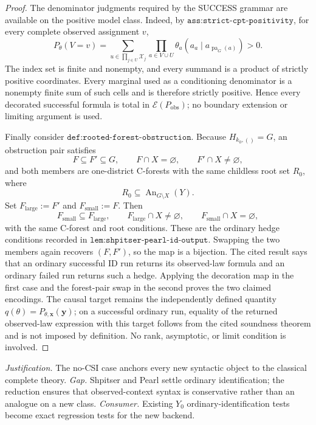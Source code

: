 \documentclass{article}
\begin{document}
\begin{proof}
The denominator judgments required by the SUCCESS grammar are available on the positive model class.  Indeed, by \(\texttt{ass:strict-cpt-positivity}\), for every complete observed assignment \(v\),
\[
  P_\theta(V=v)
  =\sum_{u\in\prod_{j\in U}\mathcal X_j}
    \prod_{a\in V\cup U}
      \theta_a\!\left(a_a\mid a_{\operatorname{pa}_G(a)}\right)>0.
\]
The index set is finite and nonempty, and every summand is a product of strictly positive coordinates.  Every marginal used as a conditioning denominator is a nonempty finite sum of such cells and is therefore strictly positive.  Hence every decorated successful formula is total in \(\mathscr E(P_{\mathrm{obs}})\); no boundary extension or limiting argument is used.

Finally consider \(\texttt{def:rooted-forest-obstruction}\).  Because \(H_{k_0,()}=G\), an obstruction pair satisfies
\[
  F\subseteq F'\subseteq G,
  \qquad F\cap X=\varnothing,
  \qquad F'\cap X\neq\varnothing,
\]
and both members are one-district C-forests with the same childless root set \(R_0\), where
\[
  R_0\subseteq\operatorname{An}_{G\setminus X}(Y).
\]
Set \(F_{\mathrm{large}}:=F'\) and \(F_{\mathrm{small}}:=F\).  Then
\[
  F_{\mathrm{small}}\subseteq F_{\mathrm{large}},
  \qquad
  F_{\mathrm{large}}\cap X\neq\varnothing,
  \qquad
  F_{\mathrm{small}}\cap X=\varnothing,
\]
with the same C-forest and root conditions.  These are the ordinary hedge conditions recorded in \(\texttt{lem:shpitser-pearl-id-output}\).  Swapping the two members again recovers \((F,F')\), so the map is a bijection.  The cited result says that an ordinary successful \(\mathrm{ID}\) run returns its observed-law formula and an ordinary failed run returns such a hedge.  Applying the decoration map in the first case and the forest-pair swap in the second proves the two claimed encodings.  The causal target remains the independently defined quantity \(q(\theta)=P_{\theta,\mathbf x}(\mathbf y)\); on a successful ordinary run, equality of the returned observed-law expression with this target follows from the cited soundness theorem and is not imposed by definition.  No rank, asymptotic, or limit condition is involved.
\end{proof}
\par\smallskip\noindent \textit{Justification.} The no-CSI case anchors every new syntactic object to the classical complete theory. \textit{Gap.} Shpitser and Pearl settle ordinary identification; the reduction ensures that observed-context syntax is conservative rather than an analogue on a new class. \textit{Consumer.} Existing \(Y_0\) ordinary-identification tests become exact regression tests for the new backend.
\end{document}
